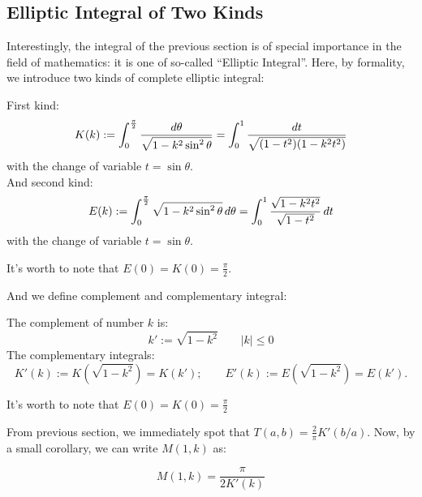 \documentclass{report}
\def\ff#1#2{\frac{#1}{#2}}
\begin{document}
\begin{titlepage}
\section{Elliptic Integral of Two Kinds\hfill}

Interestingly, the integral of the previous section is of special importance in the field of mathematics: it is one of so-called ``Elliptic Integral''.
Here, by formality, we introduce two kinds of complete elliptic integral:
\begin{D}

First kind\cite{Borwein:1987aa}:
$$
K(k):=\int_0^{\pi\over 2}\frac{d\theta}{\sqrt{1-k^2\sin^2\theta}}
=\int_0^{1}\frac{dt}{\sqrt{(1-t^2)(1-k^2t^2)}}
$$
with the change of variable $t=\sin\theta$.\\
And second kind\cite{Borwein:1987aa}:
$$
E(k):=\int_0^{\pi\over 2}\sqrt{1-k^2\sin^2\theta}\,d\theta
=\int_0^{1}\frac{\sqrt{1-k^2t^2}}{\sqrt{1-t^2}}\,dt
$$
with the change of variable $t=\sin\theta$.
\end{D}
\noindent It's worth to note that $E(0)=K(0)=\frac{\pi}{2}$. \medskip

And we define complement and  complementary integral\cite{Borwein:1987aa}:
\begin{D}
The complement of number $k$ is:
$$
k':=\sqrt{1-k^2}\qquad |k|\leq 0
$$
The complementary integrals:
$$
K'(k):=K(\sqrt{1-k^2})=K(k');\qquad E'(k):=E(\sqrt{1-k^2})=E(k').
$$
\end{D}
It's worth to note that $E(0)=K(0)=\frac{\pi}{2}$\bigskip

From previous section, we immediately spot that $T(a,b)=\ff{2}{\pi}K'(b/a)$.
Now, by a small corollary,  we can write $M(1,k)$ as\cite{Borwein:1987aa}:
\begin{Co}\label{co:central}
\[
M(1,k)=\frac{\pi}{2K'(k)}
\]
\end{Co}
%
\bigskip


\end{titlepage}
\end{document}
